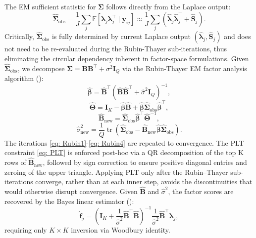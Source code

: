 \documentclass[]{report}
\theoremstyle{definition}
\begin{document}
    The EM sufficient statistic for $\bm{\Sigma}$ follows directly from the Laplace output:    
\begin{equation}
    \hat{\bm{\Sigma}}_{\text{obs}}=\frac{1}{J}\sum_{j}\mathbb{E}[\bm{\lambda}_{j} \bm{\lambda}_{j}^{\top}\mid \bm{y}_{ij}]\approx \frac{1}{J}\sum_{j}(\hat{\bm{\lambda}}_{j} \hat{\bm{\lambda}}_{j}^{\top}+\hat{\mathbf{S}}_{j}).
\end{equation}
Critically, $\hat{\bm{\Sigma}}_{\text{obs}}$ is fully determined by current Laplace output $(\hat{\bm{\lambda}}_{j}, \hat{\mathbf{S}}_{j})$ and does not need to be re-evaluated during the Rubin-Thayer sub-iterations, thus eliminating the circular dependency inherent in factor-space formulations.
    Given $\hat{\bm{\Sigma}}_{\text{obs}}$, we decompose $\bm{\Sigma}=\mathbf{BB}^{\top}+\sigma^2\mathbf{I}_{Q}$ via the Rubin-Thayer EM factor analysis algorithm (\citet{Rubin1982}):
\begin{equation}
\hat{\boldsymbol{\beta}}
=
\hat{\mathbf{B}}^\top
\left(
\hat{\mathbf{B}}\hat{\mathbf{B}}^\top
+
\hat{\sigma}^2 \mathbf{I}_Q
\right)^{-1},
\label{eq: Rubin1}
\end{equation}
\begin{equation}
\hat{\boldsymbol{\Theta}}
=
\mathbf{I}_K
-
\hat{\boldsymbol{\beta}}\hat{\mathbf{B}}
+
\hat{\boldsymbol{\beta}}
\hat{\boldsymbol{\Sigma}}_{\mathrm{obs}}
\hat{\boldsymbol{\beta}}^\top,
\label{eq: Rubin2}
\end{equation}
\begin{equation}
\hat{\mathbf{B}}_{\mathrm{new}}
=
\hat{\boldsymbol{\Sigma}}_{\mathrm{obs}}
\hat{\boldsymbol{\beta}}^\top
\hat{\boldsymbol{\Theta}}^{-1},
\label{eq: Rubin3}
\end{equation}
\begin{equation}
\hat{\sigma}_{\mathrm{new}}^{2}
=
\frac{1}{Q}
\operatorname{tr}
\left(
\hat{\boldsymbol{\Sigma}}_{\mathrm{obs}}
-
\hat{\mathbf{B}}_{\mathrm{new}}
\hat{\boldsymbol{\beta}}
\hat{\boldsymbol{\Sigma}}_{\mathrm{obs}}
\right).
\label{eq: Rubin4}
\end{equation}
The iterations  \ref{eq: Rubin1}-\ref{eq: Rubin4} are repeated to convergence. The PLT constraint \ref{eq: PLT} is enforced post-hoc via a QR decomposition of the top K rows of $\hat{\mathbf{B}}_{\text{new}}$, followed by sign correction to ensure positive diagonal entries and zeroing of the upper triangle. Applying PLT only after the Rubin–Thayer sub-iterations converge, rather than at each inner step, avoids the discontinuities that would otherwise disrupt convergence.
    Given $\hat{\mathbf{B}}$ and $\hat{\sigma}^2$, the factor scores are recovered by the Bayes linear estimator (\citet{Gelman2013}):
\begin{equation}
\hat{\mathbf{f}}_j = \left( \mathbf{I}_K + \frac{1}{\hat{\sigma}^2} \hat{\mathbf{B}}^\top \hat{\mathbf{B}} \right)^{-1} \frac{1}{\hat{\sigma}^2} \hat{\mathbf{B}}^\top \hat{\boldsymbol{\lambda}}_j ,
\label{eq: Bayeslinearestimator}
\end{equation}
requiring only $K\times K$ inversion via Woodbury identity.
\end{document}
